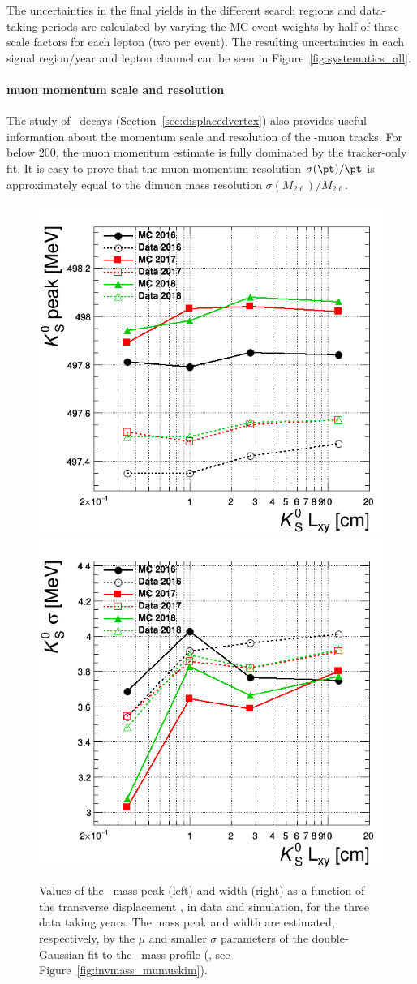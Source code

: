 The uncertainties in the final yields in the different search regions
and data-taking periods are calculated by varying the MC event weights
by half of these scale factors for each \displ lepton (\ie two per
event). The resulting uncertainties in each signal region/year and
lepton channel can be seen in Figure~\ref{fig:systematics_all}. 

\paragraph{\Displ muon momentum scale and resolution}
\label{sec:nonpromptleptonscaleresol}
The study of \PKzS\ decays (Section~\ref{sec:displacedvertex}) also
provides useful information about the momentum scale and resolution of
the \displ-muon tracks. For \pt below 200\GeV, the muon momentum 
estimate is fully dominated by the tracker-only fit. It is easy to
prove that the muon momentum resolution $\sigma(\pt)/\pt$ is
approximately equal to the dimuon mass resolution
$\sigma(M_{2\ell})/M_{2\ell}$.
\begin{figure}[h!]
  \centering
  \includegraphics[width=.40\textwidth]{Figures/c6/systematics/scale_displMu.png}
  \includegraphics[width=.40\textwidth]{Figures/c6/systematics/resolution_displMu.png}
  \caption{Values of the \PKzS\ mass peak (left) and width (right) as
    a function of the transverse displacement \Deltwod, in data and
    simulation, for the three data taking years. The mass peak and
    width are estimated, respectively, by the $\mu$ and smaller
    $\sigma$ parameters of the double-Gaussian fit to the
    \PKzS\ mass profile (\eg, see Figure~\ref{fig:invmass_mumuskim}). \dani}
  \label{fig:displMuScaleResol}
\end{figure}
